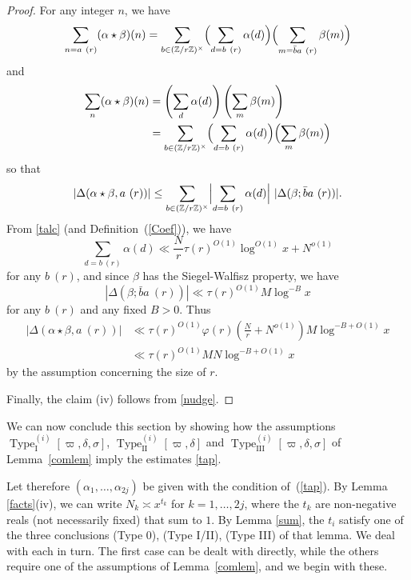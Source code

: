 \documentclass[12pt,a4paper,reqno]{amsart}
\numberwithin{equation}{section}
\theoremstyle{plain}
\theoremstyle{definition}
\newcommand\Z{\mathbb{Z}}
\newcommand\TypeI{\operatorname{Type}_{\operatorname{I}}}
\newcommand\TypeII{\operatorname{Type}_{\operatorname{II}}}
\newcommand\TypeIII{\operatorname{Type}_{\operatorname{III}}}
\renewcommand{\sim}{\asymp}
\begin{document}
\begin{proof}
For any integer $n$, we have
$$ 
\sum_{n = a\ (r)} (\alpha \star \beta)(n) = \sum_{b\in
  (\Z/r\Z)^\times} \Bigl(\sum_{d = b\ (r)} \alpha(d)\Bigr)
\Bigl(\sum_{m = \bar{b}a\ (r)} \beta(m)\Bigr)
$$
and
\begin{align*}
  \sum_{n} (\alpha \star \beta)(n) &= \left(\sum_d \alpha(d)\right) \left(\sum_m \beta(m)\right)\\
  &= \sum_{b\in (\Z/r\Z)^\times} \Bigl(\sum_{d = b\ (r)}
  \alpha(d)\Bigr) \Bigl(\sum_m \beta(m)\Bigr)
\end{align*}
so that
$$
|\Delta(\alpha \star \beta, a\ (r))|\leq \sum_{b\in (\Z/r\Z)^\times}
\Bigl|\sum_{d = b\ (r)} \alpha(d)\Bigr| \ |\Delta(\beta; \bar{b}a\
(r))|.
$$ 
From \eqref{talc} (and Definition~(\ref{Coef})), we have
$$ 
\sum_{d = b\ (r)} \alpha(d) \ll \frac{N}{r} \tau(r)^{O(1)} \log^{O(1)}
x + N^{o(1)}
$$
for any $b\ (r)$, and since $\beta$ has the Siegel-Walfisz property, we
have
$$ 
| \Delta(\beta; \bar{b}a\ (r))| \ll \tau(r)^{O(1)} M \log^{-B} x
$$
for any $b\ (r)$ and any fixed $B>0$. Thus
\begin{align*}
  |\Delta(\alpha \star \beta, a\ (r))| &\ll \tau(r)^{O(1)} \varphi(r)
  \left( \frac{N}{r} + N^{o(1)} \right) M \log^{-B + O(1)} x
  \\
  &\ll \tau(r)^{O(1)} MN \log^{-B + O(1)} x
\end{align*}
by the assumption concerning the size of $r$.

Finally, the claim (iv) follows from \eqref{nudge}.  
\end{proof}

We can now conclude this section by showing how the assumptions
$\TypeI^{(i)}[\varpi,\delta,\sigma]$, $\TypeII^{(i)}[\varpi,\delta]$
and $\TypeIII^{(i)}[\varpi,\delta,\sigma]$ of Lemma~\ref{comlem} imply
the estimates \eqref{tap}.

Let therefore $(\alpha_1,\ldots, \alpha_{2j})$ be given with the
condition of~(\ref{tap}). By Lemma \ref{facts}(iv), we can write
$N_k \sim x^{t_k}$ for $k=1,\ldots,2j$, where the $t_k$ are
non-negative reals (not necessarily fixed) that sum to $1$.  By Lemma
\ref{sum}, the $t_i$ satisfy one of the three conclusions (Type 0),
(Type I/II), (Type III) of that lemma. We deal with each in turn.  The
first case can be dealt with directly, while the others require one of
the assumptions of Lemma~\ref{comlem}, and we begin with these.
\end{document}
